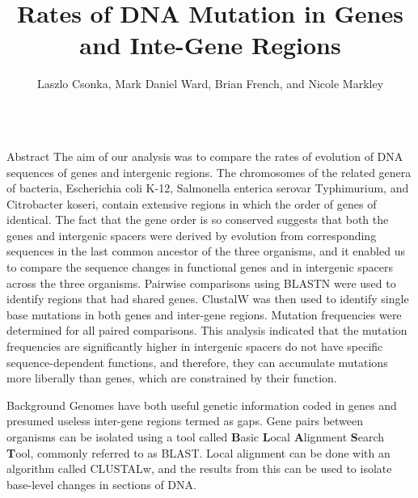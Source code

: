 \documentclass[final]{beamer}
\title[Fancy Posters]{Rates of DNA Mutation in Genes and Inte-Gene Regions}
\author{Laszlo Csonka, Mark Daniel Ward, Brian French, and Nicole Markley}
\institute{Department of Biology, Purdue University, West Lafayette, IN}
\begin{document}
  \begin{frame}{}
    \begin{columns}[t]


    \begin{column}{.32 \linewidth}
    \begin{block}{\large Abstract}
The aim of our analysis was to compare the rates of evolution of DNA sequences of genes and intergenic regions. The chromosomes of the related genera of bacteria, Escherichia coli K-12, Salmonella enterica serovar Typhimurium, and Citrobacter koseri, contain extensive regions in which the order of genes of identical. The fact that the gene order is so conserved suggests that both the genes and intergenic spacers were derived by evolution from corresponding sequences in the last common ancestor of the three organisms, and it enabled us to compare the sequence changes in functional genes and in intergenic spacers across the three organisms.
\newline
\newline
Pairwise comparisons using BLASTN were used to identify regions that had shared genes. ClustalW was then used to identify single base mutations in both genes and inter-gene regions. Mutation frequencies were determined for all paired comparisons. This analysis indicated that the mutation frequencies are significantly higher in intergenic spacers do not have specific sequence-dependent functions, and therefore, they can accumulate mutations more liberally than genes, which are constrained by their function.
    \end{block}

\begin{block}{\large Background}
Genomes have both useful genetic information coded in genes and presumed useless inter-gene regions termed as gaps. Gene pairs between organisms can be isolated using a tool called \textbf{B}asic \textbf{L}ocal \textbf{A}lignment \textbf{S}earch \textbf{T}ool, commonly referred to as BLAST. Local alignment can be done with an algorithm called CLUSTALw, and the results from this can be used to isolate base-level changes in sections of DNA.


\end{block}
\end{column}
\end{columns}
\end{frame}
\end{document}

